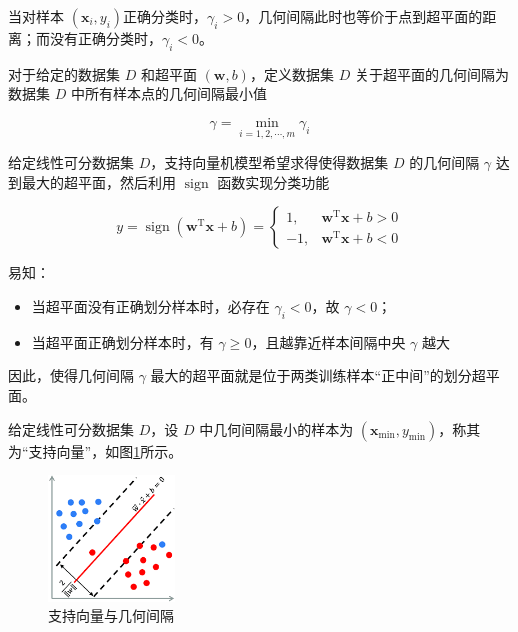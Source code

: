 \documentclass{ctexart}
\begin{document}
	当对样本 $(\boldsymbol{x}_i,y_i)$正确分类时，$\gamma_{i}>0$，几何间隔此时也等价于点到超平面的距离；而没有正确分类时，$\gamma_{i}<0$。
	
	对于给定的数据集 $D$ 和超平面 $(\boldsymbol{w},b)$，定义数据集 $D$ 关于超平面的几何间隔为数据集 $D$ 中所有样本点的几何间隔最小值
	
	\begin{equation}
		\gamma=\min _{i=1,2, \cdots, m} \gamma_{i}
	\end{equation}
	
	给定线性可分数据集 $D$，支持向量机模型希望求得使得数据集 $D$ 的几何间隔 $\gamma$ 达到最大的超平面，然后利用 $\operatorname{sign}$ 函数实现分类功能
	
	\begin{equation}
		y=\operatorname{sign}\left(\boldsymbol{w}^{\mathrm{T}} \boldsymbol{x}+b\right)=\left\{\begin{aligned}
			1, & \boldsymbol{w}^{\mathrm{T}} \boldsymbol{x}+b>0 \\
			-1, & \boldsymbol{w}^{\mathrm{T}} \boldsymbol{x}+b<0
		\end{aligned}\right.
	\end{equation}

	易知：
	
	\begin{itemize}
		\item 当超平面没有正确划分样本时，必存在 $\gamma_{i}<0$，故 $\gamma<0$；
		\item 当超平面正确划分样本时，有 $\gamma\geqslant 0$，且越靠近样本间隔中央 $\gamma$ 越大
	\end{itemize}

	因此，使得几何间隔 $\gamma$ 最大的超平面就是位于两类训练样本“正中间”的划分超平面。
	
	给定线性可分数据集 $D$，设 $D$ 中几何间隔最小的样本为 $(\boldsymbol{x}_\text{min},y_\text{min})$，称其为“支持向量”，如图\ref{支持向量}所示。
	
	\begin{figure}[!htb]
		\centering
		\includegraphics[width=0.3\textwidth]{../image/支持向量与几何间隔.png}
		\caption{支持向量与几何间隔}
		\label{支持向量}
	\end{figure}
	
\end{document}
